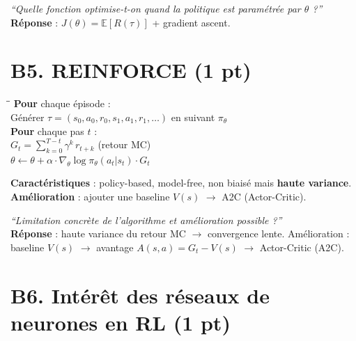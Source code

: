 \documentclass[11pt,a4paper]{article}
\newcommand{\E}{\mathbb{E}}
\begin{document}
\begin{exambox}
\textit{``Quelle fonction optimise-t-on quand la politique est paramétrée par $\theta$ ?''}\\[4pt]
\textbf{Réponse} : $J(\theta) = \E[R(\tau)]$ + gradient ascent.
\end{exambox}

\section{B5. REINFORCE (1 pt)}

\begin{formbox}[REINFORCE = Monte-Carlo Policy Gradient]
{\ttfamily
\begin{tabbing}
\hspace{6mm}\=\hspace{6mm}\=\kill
\textbf{Pour} chaque épisode :\\
\> Générer $\tau = (s_0, a_0, r_0, s_1, a_1, r_1, \ldots)$ en suivant $\pi_\theta$\\
\> \textbf{Pour} chaque pas $t$ :\\
\>\> $G_t = \sum_{k=0}^{T-t} \gamma^k \, r_{t+k}$ \quad (retour MC)\\
\>\> $\theta \leftarrow \theta + \alpha \cdot \nabla_\theta \log \pi_\theta(a_t|s_t) \cdot G_t$
\end{tabbing}}
\vspace{2pt}
\textbf{Caractéristiques} : policy-based, model-free, non biaisé mais \textbf{haute variance}.\\
\textbf{Amélioration} : ajouter une baseline $V(s)$ $\to$ A2C (Actor-Critic).
\end{formbox}

\begin{exambox}
\textit{``Limitation concrète de l'algorithme et amélioration possible ?''}\\[4pt]
\textbf{Réponse} : haute variance du retour MC $\to$ convergence lente. Amélioration : baseline $V(s)$ $\to$ avantage $A(s,a) = G_t - V(s)$ $\to$ Actor-Critic (A2C).
\end{exambox}

\section{B6. Intérêt des réseaux de neurones en RL (1 pt)}
\end{document}
